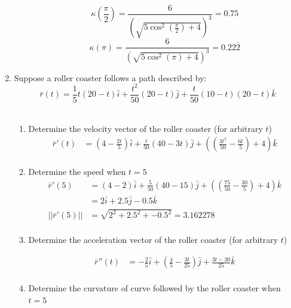 \documentclass[a4paper,11pt]{article}
\begin{document}
\begin{enumerate}
\begin{enumerate}
        $$ \kappa(\frac{\pi}{2}) = \frac{6}{\left(\sqrt{5\cos^2(\frac{\pi}{2}) + 4}\right)^3}= 0.75$$
        $$ \kappa(\pi) = \frac{6}{\left(\sqrt{5\cos^2(\pi) + 4}\right)^3} = 0.22\bar{2}$$

    \end{enumerate}

    \newpage
    \item Suppose a roller coaster follows a path described by:
    $$ \bar{r}(t) = \frac{1}{5}t(20-t)\bar{i} + \frac{t^2}{50}(20-t)\bar{j} + \frac{t}{50}(10-t)(20-t)\bar{k} $$\\

    \begin{enumerate}
        \item Determine the velocity vector of the roller coaster (for arbitrary $t$)
        \begin{align*}
            \bar{r}'(t) &= (4 - \frac{2t}{5}) \bar{i} + \frac{t}{50}(40-3t)\bar{j} + \left(\left(\frac{3t^2}{50}-\frac{6t}{5}\right)+4\right)\bar{k}\\
        \end{align*}

        \item Determine the speed when $t = 5$
        \begin{align*}
            \bar{r}'(5) &= (4 - 2) \bar{i} + \frac{5}{50}(40-15)\bar{j} + \left(\left(\frac{75}{50}-\frac{30}{5}\right)+4\right)\bar{k}\\
            &= 2\bar{i} + 2.5\bar{j} - 0.5\bar{k}\\
            || \bar{r}'(5) || &= \sqrt{2^2 + 2.5^2 + -0.5^2} = 3.162278\\
        \end{align*}

        \item  Determine the acceleration vector of the roller coaster (for arbitrary $t$)

        \begin{align*}
            \bar{r}''(t) &= -\frac{2}{5}\bar{i} + (\frac{4}{5} - \frac{3t}{25})\bar{j} + \frac{3t-30}{25}\bar{k}\\
        \end{align*}

        \item Determine the curvature of curve followed by the roller coaster when $t = 5$
        

\end{enumerate}
\end{enumerate}
\end{document}
